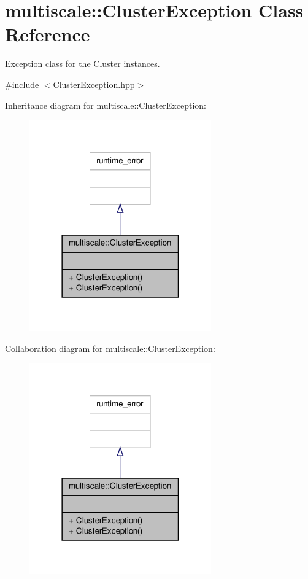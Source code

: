 \hypertarget{classmultiscale_1_1ClusterException}{\section{multiscale\-:\-:Cluster\-Exception Class Reference}
\label{classmultiscale_1_1ClusterException}
}


Exception class for the Cluster instances.  




{\ttfamily \#include $<$Cluster\-Exception.\-hpp$>$}



Inheritance diagram for multiscale\-:\-:Cluster\-Exception\-:
\nopagebreak
\begin{figure}[H]
\begin{center}
\leavevmode
\includegraphics[width=222pt]{classmultiscale_1_1ClusterException__inherit__graph}
\end{center}
\end{figure}


Collaboration diagram for multiscale\-:\-:Cluster\-Exception\-:
\nopagebreak
\begin{figure}[H]
\begin{center}
\leavevmode
\includegraphics[width=222pt]{classmultiscale_1_1ClusterException__coll__graph}
\end{center}
\end{figure}
